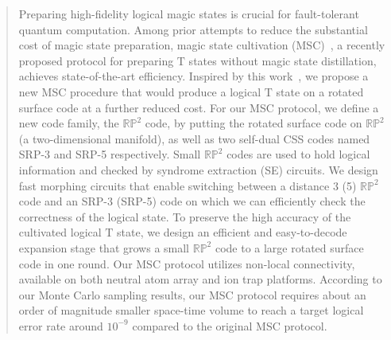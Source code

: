 \documentclass[reprint,aps,twocolumn,superscriptaddress,showpacs,notitlepage,10pt]{revtex4-2}
\theoremstyle{definition}
\begin{document}
\date{\today}



\begin{abstract}
Preparing high-fidelity logical magic states is crucial for fault-tolerant quantum computation. Among prior attempts to reduce the substantial cost of magic state preparation, magic state cultivation (MSC)~\cite{gidney_magic_2024}, a recently proposed protocol for preparing $\mathrm{T}$ states without magic state distillation, achieves state-of-the-art efficiency. Inspired by this work~\cite{gidney_magic_2024}, we propose a new MSC procedure that would produce a logical $\mathrm{T}$ state on a rotated surface code at a further reduced cost. For our MSC protocol, we define a new code family, the $\mathbb
{RP}^2$ code, by putting the rotated surface code on $\mathbb{RP}^2$ (a two-dimensional manifold), as well as two self-dual CSS codes named SRP-3 and SRP-5 respectively. Small $\mathbb{RP}^2$ codes are used to hold logical information and checked by syndrome extraction (SE) circuits. We design fast morphing circuits that enable switching between a distance 3 (5) $\mathbb{RP}^2$ code and an SRP-3 (SRP-5) code on which we can efficiently check the correctness of the logical state. To preserve the high accuracy of the cultivated logical $\mathrm{T}$ state, we design an efficient and easy-to-decode expansion stage that grows a small $\mathbb{RP}^2$ code to a large rotated surface code in one round. Our MSC protocol utilizes non-local connectivity, available on both neutral atom array and ion trap platforms.  According to our Monte Carlo sampling results, our MSC protocol requires about an order of magnitude smaller space-time volume to reach a target logical error rate around $10^{-9}$ compared to the original MSC protocol. 
\end{abstract}

\maketitle		
\end{document}
